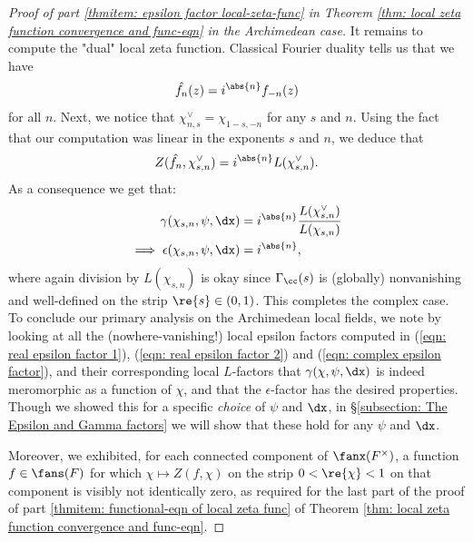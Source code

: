 \documentclass[11pt, x11names, openany]{book}
\begin{document}
\begin{proof}[Proof of part \ref{thmitem: epsilon factor local-zeta-func} in Theorem \ref{thm: local zeta function convergence and func-eqn} in the Archimedean case]
It remains to compute the "dual" local zeta function. Classical Fourier duality tells us that we have
\begin{equation*}
    \hat{f_n}(z) = i^{\abs{n}}f_{-n}(z)
\end{equation*}
for all $n$. Next, we notice that $\chi^\lor_{n, s} = \chi_{1-s, -n}$ for any $s$ and $n$. Using the fact that our computation was linear in the exponents $s$ and $n$, we deduce that
\begin{equation*}
    Z(\hat{f_n}, \chi^\lor_{s, n})  = i^{\abs{n}}L(\chi^\lor_{s, n}).
\end{equation*}
As a consequence we get that:
\begin{align}
    \label{eqn: complex epsilon factor}
    \gamma(\chi_{s, n}, \psi, \dx) &= i^{\abs{n}} \frac{L(\chi^\lor_{s, n})}{L(\chi_{s, n})} \nonumber \\
    \implies  \epsilon(\chi_{s, n}, \psi, \dx) &= i^{\abs{n}},
\end{align}
where again division by $L(\chi_{s, n})$ is okay since $\Gamma_\cc(s)$ is (globally) nonvanishing and well-defined on the strip $\re{s} \in (0, 1)$. This completes the complex case.\\

To conclude our primary analysis on the Archimedean local fields, we note by looking at all the (nowhere-vanishing!) local epsilon factors computed in (\ref{eqn: real epsilon factor 1}), (\ref{eqn: real epsilon factor 2}) and (\ref{eqn: complex epsilon factor}), and their corresponding local $L$-factors that $\gamma(\chi, \psi, \dx)$ is indeed meromorphic as a function of $\chi$, and that the $\epsilon$-factor has the desired properties. Though we showed this for a specific \textit{choice} of $\psi$ and $\dx$, in \S \ref{subsection: The Epsilon and Gamma factors} we will show that these hold for any $\psi$ and $\dx$.

Moreover, we exhibited, for each connected component of $\fanx(F^\times)$, a function $f \in \fans(F)$ for which $\chi \mapsto Z(f, \chi)$ on the strip $0 < \re{\chi} < 1$ on that component is visibly not identically zero, as required for the last part of the proof of part \ref{thmitem: functional-eqn of local zeta func} of Theorem \ref{thm: local zeta function convergence and func-eqn}.
\end{proof}
\end{document}
